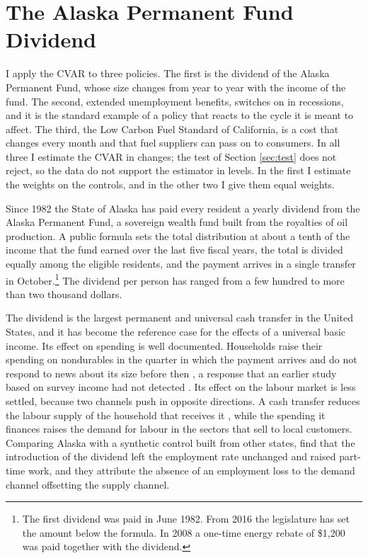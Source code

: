 \documentclass[12pt,a4paper]{article}
\theoremstyle{definition}
\theoremstyle{definition}\newtheorem{example}{Example}
\theoremstyle{definition}\newtheorem{definition}{Definition}
\begin{document}
\section{The Alaska Permanent Fund Dividend\label{sec:alaska}}

I apply the CVAR to three policies. The first is the dividend of the Alaska Permanent Fund, whose size changes from year to year with the income of the fund. The second, extended unemployment benefits, switches on in recessions, and it is the standard example of a policy that reacts to the cycle it is meant to affect. The third, the Low Carbon Fuel Standard of California, is a cost that changes every month and that fuel suppliers can pass on to consumers. In all three I estimate the CVAR in changes; the test of Section \ref{sec:test} does not reject, so the data do not support the estimator in levels. In the first I estimate the weights on the controls, and in the other two I give them equal weights.

Since 1982 the State of Alaska has paid every resident a yearly dividend from the Alaska Permanent Fund, a sovereign wealth fund built from the royalties of oil production. A public formula sets the total distribution at about a tenth of the income that the fund earned over the last five fiscal years, the total is divided equally among the eligible residents, and the payment arrives in a single transfer in October.\footnote{The first dividend was paid in June 1982. From 2016 the legislature has set the amount below the formula. In 2008 a one-time energy rebate of \$1,200 was paid together with the dividend.} The dividend per person has ranged from a few hundred to more than two thousand dollars.

The dividend is the largest permanent and universal cash transfer in the United States, and it has become the reference case for the effects of a universal basic income. Its effect on spending is well documented. Households raise their spending on nondurables in the quarter in which the payment arrives and do not respond to news about its size before then \citep{Kueng2018}, a response that an earlier study based on survey income had not detected \citep{Hsieh2003}. Its effect on the labour market is less settled, because two channels push in opposite directions. A cash transfer reduces the labour supply of the household that receives it \citep{Cesarini2017}, while the spending it finances raises the demand for labour in the sectors that sell to local customers. Comparing Alaska with a synthetic control built from other states, \citet{JonesMarinescu2022} find that the introduction of the dividend left the employment rate unchanged and raised part-time work, and they attribute the absence of an employment loss to the demand channel offsetting the supply channel.
\end{document}
